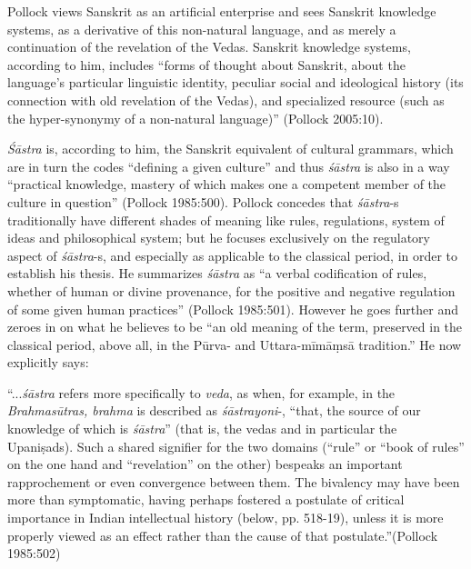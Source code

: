 Pollock views Sanskrit as an artificial enterprise and sees Sanskrit knowledge systems, as a derivative of this non-natural language, and as merely a continuation of the revelation of the Vedas. Sanskrit knowledge systems, according to him, includes ``forms of thought about Sanskrit, about the language's particular linguistic identity, peculiar social and ideological history (its connection with old revelation of the Vedas), and specialized resource (such as the hyper-synonymy of a non-natural language)'' (Pollock 2005:10). 

{\sl Śāstra} is, according to him, the Sanskrit equivalent of cultural grammars, which are in turn the codes ``defining a given culture'' and thus {\sl śāstra} is also in a way ``practical knowledge, mastery of which makes one a competent member of the culture in question'' (Pollock 1985:500). Pollock concedes that {\sl śāstra}-s traditionally have different shades of meaning like rules, regulations, system of ideas and philosophical system; but he focuses exclusively on the regulatory  aspect of {\sl śāstra}-s, and especially as applicable to the classical period, in order to establish his thesis. He summarizes {\sl śāstra} as ``a verbal codification of rules, whether of human or divine provenance, for the positive and negative regulation of some given human practices'' (Pollock 1985:501). However he goes further and zeroes in on what he believes to be ``an old meaning of the term, preserved in the classical period, above all, in the Pūrva- and Uttara-mīmāṃsā tradition.'' He now explicitly says: 
\begin{myquote}
``...{\sl śāstra} refers more specifically to {\sl veda}, as when, for example, in the {\sl Brahmasūtras, brahma} is described as {\sl śāstrayoni}-, ``that, the source of our knowledge of which is {\sl śāstra}'' (that is, the vedas and in particular the Upaniṣads). Such a shared signifier for the two domains (``rule'' or ``book of rules'' on the one hand and ``revelation'' on the other) bespeaks an important rapprochement or even convergence between them. The bivalency may have been more than symptomatic, having perhaps fostered a postulate of critical importance in Indian intellectual history (below, pp. 518-19), unless it is more properly viewed as an effect rather than the cause of that postulate.”\hfill 	(Pollock 1985:502)
\end{myquote}

